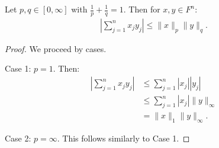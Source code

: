     \begin{lemma}\label{lemma:holders}
        Let $p,q \in [0,\infty]$ with $\frac{1}{p} + \frac{1}{q} = 1$. Then for $x,y \in F^n$:
            \begin{equation*}
            \begin{split}
                \left|\sum_{j = 1}^n x_j y_j\right| \leq \lVert x \rVert _p \lVert y \rVert _q.
            \end{split}
            \end{equation*}
    \end{lemma}
        \begin{proof}
            We proceed by cases. \nl
            
            Case 1: $p=1$. Then:
                \begin{equation*}
                \begin{split}
                    \left|\sum_{j = 1}^n x_j y_j\right|
                    & \leq \sum_{j = 1}^n |x_j||y_j| \\
                    & \leq \sum_{j = 1}^n |x_j| \lVert y \rVert _\infty \\
                    & = \lVert x \rVert _1 \lVert y \rVert _\infty.
                \end{split}
                \end{equation*}

            Case 2: $p = \infty$. This follows similarly to Case 1. \nl
            

\end{proof}
